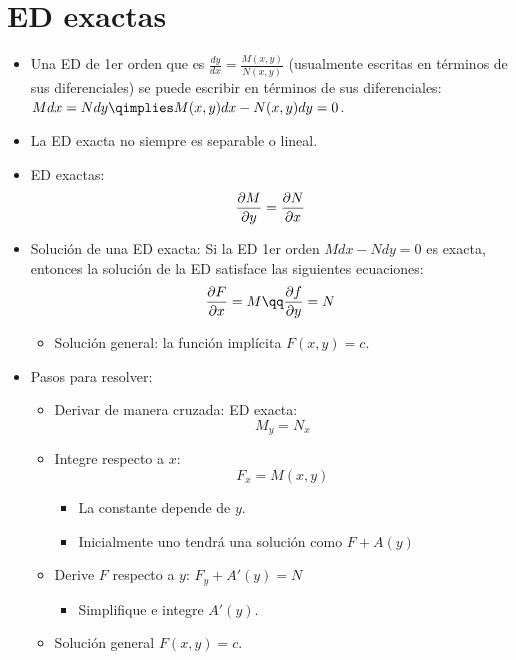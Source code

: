 \section{ED exactas}
\begin{itemize}
    \item Una ED de 1er orden que es $\displaystyle \frac{d y}{d x} = \frac{M(x,y)}{N(x,y)}$ (usualmente escritas en términos de sus diferenciales) se puede escribir en términos de sus diferenciales: $\displaystyle Mdx = Ndy \qimplies M(x,y)dx-N(x,y)dy = 0$.
    \item La ED exacta no siempre es separable o lineal.
    \item ED exactas: 
        \[
            \frac{\partial M}{\partial y} = \frac{\partial N}{\partial x} \\ 
        \]
    
    \item Solución de una ED exacta: Si la ED 1er orden $\displaystyle Mdx - Ndy = 0$ es exacta, entonces la solución de la ED satisface las siguientes ecuaciones:
        \[
          \frac{\partial F}{\partial x}  = M \qq \frac{\partial f}{\partial y} = N
        \]
        \begin{itemize}
            \item Solución general: la función implícita $F(x,y)=c$.
        \end{itemize}
    
    \item Pasos para resolver:
        \begin{itemize}
            \item Derivar de manera cruzada: ED exacta:
                \[
                  M_y = N_x
                \]
            
            \item Integre respecto a $x$:
                \[
                  F_x = M(x,y)
                \]
                \begin{itemize}
                    \item La constante depende de $y$.
                    \item Inicialmente uno tendrá una solución como $\displaystyle F+A(y)$ 
                \end{itemize}
            
            \item Derive $F$ respecto a $y$: $\displaystyle F_y+A'(y)=N$ 
                \begin{itemize}
                    \item Simplifique e integre $A'(y)$.
                \end{itemize}
            
            \item Solución general $\displaystyle F(x,y)=c$.
        \end{itemize}
\end{itemize}

